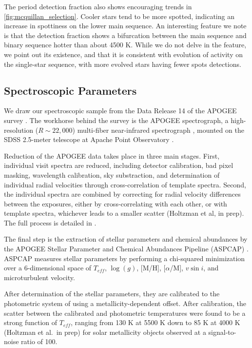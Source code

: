 \documentclass[manuscript]{aastex6}
\newcommand{\vsini}{\ensuremath{v \sin i}}
\newcommand{\Teff}{\ensuremath{T_{eff}}}
\newcommand{\logg}{\ensuremath{\log(g)}}
\begin{document}
The period detection fraction also shows encouraging trends in
\cref{fig:mcquillan_selection}. Cooler stars tend
to be more spotted, indicating an increase in spottiness on the lower main
sequence. An interesting feature we note is that the detection fraction shows a
bifurcation between the main sequence and binary sequence hotter than about
4500 K. While we do not delve in the feature, we point out its existence, and
that it is consistent with evolution of activity on the single-star sequence, 
with more evolved stars having fewer spots detections.

\subsection{Spectroscopic Parameters}

We draw our spectroscopic sample from the Data Release 14 \citep{Abolfathi18}
of the APOGEE survey \citep{Majewski17}. The workhorse behind the survey is the
APOGEE spectrograph, a high-resolution (\(R \sim 22,000\)) multi-fiber
near-infrared spectrograph \citep{Wilson10}, mounted on the SDSS 2.5-meter
telescope at Apache Point Observatory \citep{Gunn06}.

Reduction of the APOGEE data takes place in three main stages. First,
individual visit spectra are reduced, including detector calibration, bad pixel
masking, wavelength calibration, sky substraction, and determination of
individual radial velocities through cross-correlation of template spectra.
Second, the individual spectra are combined by correcting for radial velocity
differences between the exposures, either by cross-correlating with each other,
or with template spectra, whichever leads to a smaller scatter (Holtzman et
al, in prep). The full process is detailed in \citet{Nidever15}.

The final step is the extraction of stellar parameters and chemical abundances
by the APOGEE Stellar Parameter and Chemical Abundances Pipeline (ASPCAP)
\citep{GarciaPerez16}. ASPCAP measures stellar parameters by performing a
chi-squared minimization \citep{AllendePrieto06} over a 6-dimensional space of
\Teff, \logg, [M/H], [\(\alpha\)/M], \vsini, and microturbulent velocity.

After determination of the stellar parameters, they are calibrated to the
photometric system of \citet{GonzalezHernandez09} using a metallicity-dependent
offset. After calibration, the scatter between the calibrated and photometric
temperatures  were found to be a strong function of \Teff{}, ranging from 130 
K at 5500 K down to 85 K at 4000 K (Holtzman et al.\ in prep) for solar
metallicity objects observed at a signal-to-noise ratio of 100. 
\end{document}
